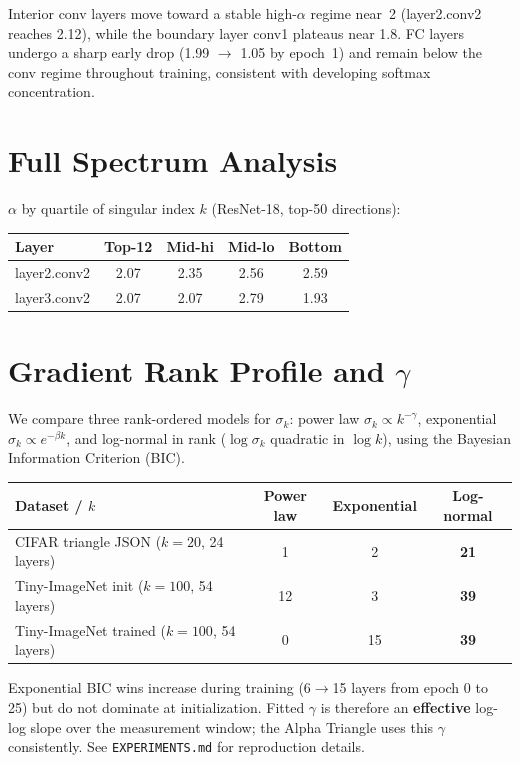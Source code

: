 \documentclass{article}
\begin{document}
Interior conv layers move toward a stable high-$\alpha$ regime near~2 (layer2.conv2 reaches 2.12), while the boundary layer conv1 plateaus near 1.8. FC layers undergo a sharp early drop (1.99 $\to$ 1.05 by epoch~1) and remain below the conv regime throughout training, consistent with developing softmax concentration.

\section{Full Spectrum Analysis}\label{app:full-spectrum}

$\alpha$ by quartile of singular index $k$ (ResNet-18, top-50 directions):

\begin{center}
\small
\begin{tabular}{lcccc}
\toprule
Layer & Top-12 & Mid-hi & Mid-lo & Bottom \\
\midrule
layer2.conv2 & 2.07 & 2.35 & 2.56 & 2.59 \\
layer3.conv2 & 2.07 & 2.07 & 2.79 & 1.93 \\
\bottomrule
\end{tabular}
\end{center}

\section{Gradient Rank Profile and $\gamma$}\label{app:gamma-profile}

We compare three rank-ordered models for $\sigma_k$: power law $\sigma_k \propto k^{-\gamma}$, exponential $\sigma_k \propto e^{-\beta k}$, and log-normal in rank ($\log\sigma_k$ quadratic in $\log k$), using the Bayesian Information Criterion (BIC).

\begin{center}
\small
\begin{tabular}{lccc}
\toprule
\textbf{Dataset / $k$} & Power law & Exponential & Log-normal \\
\midrule
CIFAR triangle JSON ($k{=}20$, 24 layers) & 1 & 2 & \textbf{21} \\
Tiny-ImageNet init ($k{=}100$, 54 layers) & 12 & 3 & \textbf{39} \\
Tiny-ImageNet trained ($k{=}100$, 54 layers) & 0 & 15 & \textbf{39} \\
\bottomrule
\end{tabular}
\end{center}

\noindent Exponential BIC wins increase during training (6$\to$15 layers from epoch 0 to 25) but do not dominate at initialization. Fitted $\gamma$ is therefore an \textbf{effective} log-log slope over the measurement window; the Alpha Triangle uses this $\gamma$ consistently. See \texttt{EXPERIMENTS.md} for reproduction details.
\end{document}
